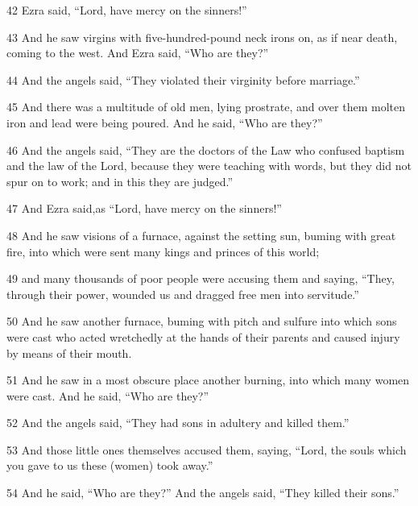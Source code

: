 \par 42 Ezra said, “Lord, have mercy on the sinners!”

\par 43 And he saw virgins with five-hundred-pound neck irons on, as if near death, coming to the west. And Ezra said, “Who are they?”

\par 44 And the angels said, “They violated their virginity before marriage.” 

\par 45 And there was a multitude of old men, lying prostrate, and over them molten iron and lead were being poured. And he said, “Who are they?”

\par 46 And the angels said, “They are the doctors of the Law who confused baptism and the law of the Lord, because they were teaching with words, but they did not spur on to work; and in this they are judged.”

\par 47 And Ezra said,as “Lord, have mercy on the sinners!”

\par 48 And he saw visions of a furnace, against the setting sun, buming with great fire, into which were sent many kings and princes of this world;

\par 49 and many thousands of poor people were accusing them and saying, “They, through their power, wounded us and dragged free men into servitude.”

\par 50 And he saw another furnace, buming with pitch and sulfure into which sons were cast who acted wretchedly at the hands of their parents and caused injury by means of their mouth.

\par 51 And he saw in a most obscure place another burning, into which many women were cast. And he said, “Who are they?”

\par 52 And the angels said, “They had sons in adultery and killed them.”

\par 53 And those little ones themselves accused them, saying, “Lord, the souls which you gave to us these (women) took away.”

\par 54 And he said, “Who are they?” And the angels said,  “They killed their sons.”

